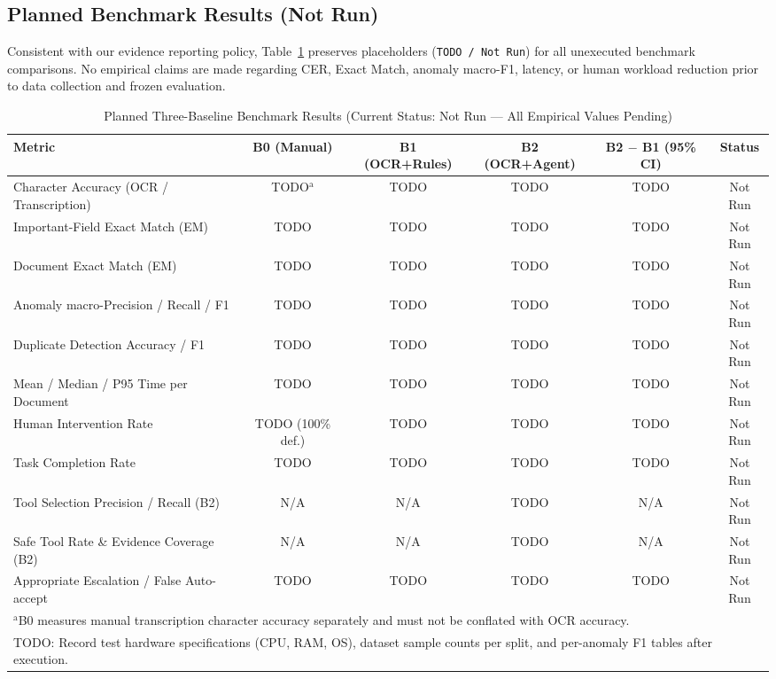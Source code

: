 \documentclass[conference]{IEEEtran}
\begin{document}
\subsection{Planned Benchmark Results (Not Run)}
Consistent with our evidence reporting policy, Table~\ref{tab:planned_results} preserves placeholders (\texttt{TODO / Not Run}) for all unexecuted benchmark comparisons. No empirical claims are made regarding CER, Exact Match, anomaly macro-F1, latency, or human workload reduction prior to data collection and frozen evaluation.

\begin{table}[t]
\caption{Planned Three-Baseline Benchmark Results (Current Status: Not Run --- All Empirical Values Pending)}
\label{tab:planned_results}
\centering
\footnotesize
\setlength{\tabcolsep}{3.5pt}
\begin{tabular}{|l|c|c|c|c|c|}
\hline
\textbf{Metric} & \textbf{B0 (Manual)} & \textbf{B1 (OCR+Rules)} & \textbf{B2 (OCR+Agent)} & \textbf{B2 $-$ B1 (95\% CI)} & \textbf{Status} \\
\hline
Character Accuracy (OCR / Transcription) & TODO$^{\mathrm{a}}$ & TODO & TODO & TODO & Not Run \\
Important-Field Exact Match (EM) & TODO & TODO & TODO & TODO & Not Run \\
Document Exact Match (EM) & TODO & TODO & TODO & TODO & Not Run \\
Anomaly macro-Precision / Recall / F1 & TODO & TODO & TODO & TODO & Not Run \\
Duplicate Detection Accuracy / F1 & TODO & TODO & TODO & TODO & Not Run \\
Mean / Median / P95 Time per Document & TODO & TODO & TODO & TODO & Not Run \\
Human Intervention Rate & TODO (100\% def.) & TODO & TODO & TODO & Not Run \\
Task Completion Rate & TODO & TODO & TODO & TODO & Not Run \\
Tool Selection Precision / Recall (B2) & N/A & N/A & TODO & N/A & Not Run \\
Safe Tool Rate \& Evidence Coverage (B2) & N/A & N/A & TODO & N/A & Not Run \\
Appropriate Escalation / False Auto-accept & TODO & TODO & TODO & TODO & Not Run \\
\hline
\multicolumn{6}{l}{$^{\mathrm{a}}$B0 measures manual transcription character accuracy separately and must not be conflated with OCR accuracy.} \\
\multicolumn{6}{l}{TODO: Record test hardware specifications (CPU, RAM, OS), dataset sample counts per split, and per-anomaly F1 tables after execution.} \\
\end{tabular}
\end{table}
\end{document}
